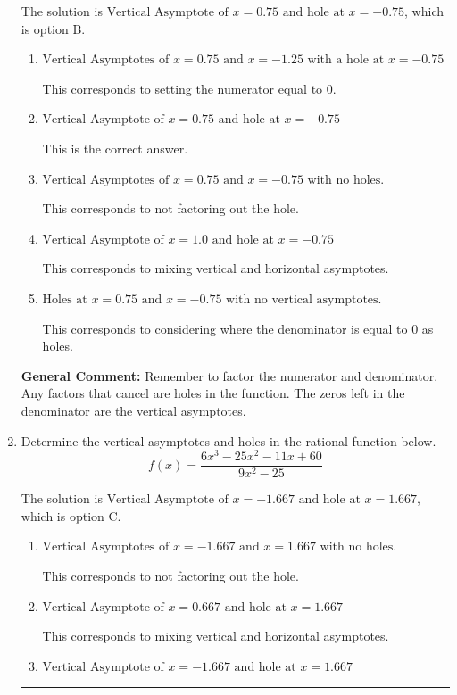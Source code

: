 \documentclass{extbook}[14pt]
\newcommand{\litem}[1]{\item #1

\rule{\textwidth}{0.4pt}}
\begin{document}
\begin{enumerate}
{The solution is \( \text{Vertical Asymptote of } x = 0.75 \text{ and hole at } x = -0.75 \), which is option B.\begin{enumerate}[label=\Alph*.]
\item \( \text{Vertical Asymptotes of } x = 0.75 \text{ and } x = -1.25 \text{ with a hole at } x = -0.75 \)

This corresponds to setting the numerator equal to 0.
\item \( \text{Vertical Asymptote of } x = 0.75 \text{ and hole at } x = -0.75 \)

This is the correct answer.
\item \( \text{Vertical Asymptotes of } x = 0.75 \text{ and } x = -0.75 \text{ with no holes.} \)

This corresponds to not factoring out the hole.
\item \( \text{Vertical Asymptote of } x = 1.0 \text{ and hole at } x = -0.75 \)

This corresponds to mixing vertical and horizontal asymptotes.
\item \( \text{Holes at } x = 0.75 \text{ and } x = -0.75 \text{ with no vertical asymptotes.} \)

This corresponds to considering where the denominator is equal to 0 as holes.
\end{enumerate}

\textbf{General Comment:} Remember to factor the numerator and denominator. Any factors that cancel are holes in the function. The zeros left in the denominator are the vertical asymptotes.
}
\litem{
Determine the vertical asymptotes and holes in the rational function below.
\[ f(x) = \frac{6x^{3} -25 x^{2} -11 x + 60}{9x^{2} -25} \]

The solution is \( \text{Vertical Asymptote of } x = -1.667 \text{ and hole at } x = 1.667 \), which is option C.\begin{enumerate}[label=\Alph*.]
\item \( \text{Vertical Asymptotes of } x = -1.667 \text{ and } x = 1.667 \text{ with no holes.} \)

This corresponds to not factoring out the hole.
\item \( \text{Vertical Asymptote of } x = 0.667 \text{ and hole at } x = 1.667 \)

This corresponds to mixing vertical and horizontal asymptotes.
\item \( \text{Vertical Asymptote of } x = -1.667 \text{ and hole at } x = 1.667 \)


\end{enumerate}}
\end{enumerate}
\end{document}
